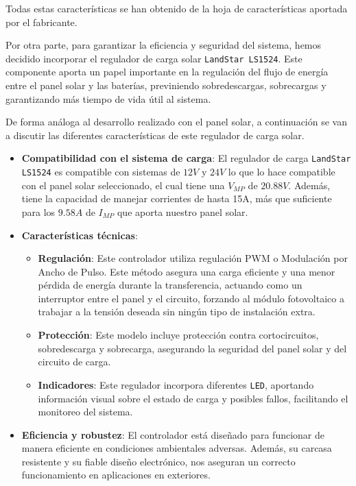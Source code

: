 Todas estas características se han obtenido de la hoja de características aportada por el fabricante. \cite{semperesolutionsPanelSolarMonocristalino}

Por otra parte, para garantizar la eficiencia y seguridad del sistema, hemos decidido incorporar el regulador de carga solar \texttt{LandStar LS1524}. Este componente aporta un papel importante en la regulación del flujo de energía entre el panel solar y las baterías, previniendo sobredescargas, sobrecargas y garantizando más tiempo de vida útil al sistema.

De forma análoga al desarrollo realizado con el panel solar, a continuación se van a discutir las diferentes características de este regulador de carga solar.

\begin{itemize}
    \item \textbf{Compatibilidad con el sistema de carga}: El regulador de carga \texttt{LandStar LS1524} es compatible con sistemas de $12 V$ y $24 V$ lo que lo hace compatible con el panel solar seleccionado, el cual tiene una $V_{MP}$ de $20.88 V$. Además, tiene la capacidad de manejar corrientes de hasta 15A, más que suficiente para los $9.58 A$ de $I_{MP}$ que aporta nuestro panel solar.

    \item \textbf{Características técnicas}:
    \begin{itemize}
        \item \textbf{Regulación}: Este controlador utiliza regulación PWM o Modulación por Ancho de Pulso. Este método asegura una carga eficiente y una menor pérdida de energía durante la transferencia, actuando como un interruptor entre el panel y el circuito, forzando al módulo fotovoltaico a trabajar a la tensión deseada sin ningún tipo de instalación extra.
        \item \textbf{Protección}: Este modelo incluye protección contra cortocircuitos, sobredescarga y sobrecarga, asegurando la seguridad del panel solar y del circuito de carga.
        \item \textbf{Indicadores}: Este regulador incorpora diferentes \texttt{LED}, aportando información visual sobre el estado de carga y posibles fallos, facilitando el monitoreo del sistema.
    \end{itemize}

    \item \textbf{Eficiencia y robustez}: El controlador está diseñado para funcionar de manera eficiente en condiciones ambientales adversas. Además, su carcasa resistente y su fiable diseño electrónico, nos aseguran un correcto funcionamiento en aplicaciones en exteriores.


\end{itemize}
